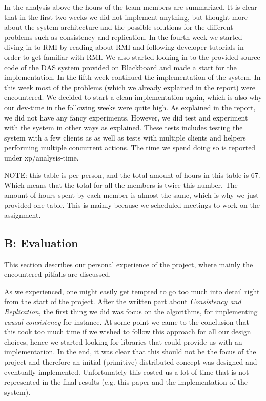 In the analysis above the hours of the team members are summarized. 
It is clear that in the first two weeks we did not implement anything, but thought more about the system architecture and the possible solutions for the different problems such as consistency and replication.
In the fourth week we started diving in to RMI by reading about RMI and following developer tutorials in order to get familiar with  RMI.
We also started looking in to the provided source code of the DAS system provided on Blackboard and made a start for the implementation.
In the fifth week continued the implementation of the system.
In this week most of the problems (which we already explained in the report) were encountered. 
We decided to start a clean implementation again, which is also why our dev-time in the following weeks were quite high.
As explained in the report, we did not have any fancy experiments. 
However, we did test and experiment with the system in other ways as explained.
These tests includes testing the system with a few clients as as well as tests with multiple clients and helpers performing multiple concurrent actions.
The time we spend doing so is reported under xp/analysis-time.

NOTE: this table is per person, and the total amount of hours in this table is 67.
Which means that the total for all the members is twice this number.
The amount of hours spent by each member is almost the same, which is why we just provided one table.
This is mainly because we scheduled meetings to work on the assignment.

\subsection{B: Evaluation}

This section describes our personal experience of the project, where mainly the encountered pitfalls are discussed.

As we experienced, one might easily get tempted to go too much into detail right from the start of the project.
After the written part about \emph{Consistency and Replication}, the first thing we did was focus on the algorithms, for implementing \emph{causal consistency} for instance. 
At some point we came to the conclusion that this took too much time if we wished to follow this approach for all our design choices, hence we started looking for libraries that could provide us with an implementation. 
In the end, it was clear that this should not be the focus of the project and therefore an initial (primitive) distributed concept was designed and eventually implemented. 
Unfortunately this costed us a lot of time that is not represented in the final results (e.g. this paper and the implementation of the system).

